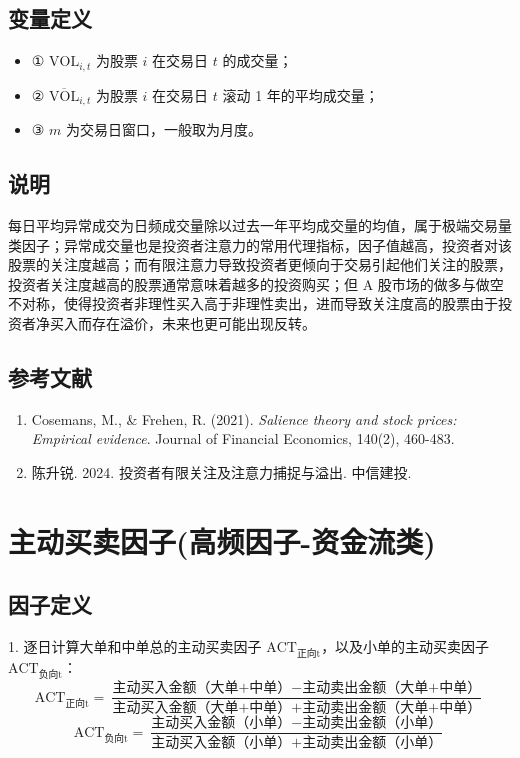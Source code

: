 \documentclass{article}
\begin{document}
\subsection{变量定义}
\begin{itemize}
    \item ① \( \mathrm{VOL}_{i,t} \) 为股票 \( i \) 在交易日 \( t \) 的成交量；
    \item ② \( \overline{\mathrm{VOL}}_{i,t} \) 为股票 \( i \) 在交易日 \( t \) 滚动 1 年的平均成交量；
    \item ③ \( m \) 为交易日窗口，一般取为月度。
\end{itemize}

\subsection{说明}
每日平均异常成交为日频成交量除以过去一年平均成交量的均值，属于极端交易量类因子；异常成交量也是投资者注意力的常用代理指标，因子值越高，投资者对该股票的关注度越高；而有限注意力导致投资者更倾向于交易引起他们关注的股票，投资者关注度越高的股票通常意味着越多的投资购买；但 A 股市场的做多与做空不对称，使得投资者非理性买入高于非理性卖出，进而导致关注度高的股票由于投资者净买入而存在溢价，未来也更可能出现反转。

\subsection{参考文献}
\begin{enumerate}
    \item Cosemans, M., \& Frehen, R. (2021). \textit{Salience theory and stock prices: Empirical evidence}. Journal of Financial Economics, 140(2), 460-483.
    \item 陈升锐. 2024. 投资者有限关注及注意力捕捉与溢出. 中信建投.
\end{enumerate}

\section{主动买卖因子(高频因子-资金流类)}

\subsection{因子定义}

1. 逐日计算大单和中单总的主动买卖因子 \( \mathrm{ACT}_{\text{正向t}} \)，以及小单的主动买卖因子 \( \mathrm{ACT}_{\text{负向t}} \)：
\begin{equation}
    \mathrm{ACT}_{\text{正向t}} = \frac{\text{主动买入金额（大单+中单）} - \text{主动卖出金额（大单+中单）}}{\text{主动买入金额（大单+中单）} + \text{主动卖出金额（大单+中单）}}
\end{equation}
\begin{equation}
    \mathrm{ACT}_{\text{负向t}} = \frac{\text{主动买入金额（小单）} - \text{主动卖出金额（小单）}}{\text{主动买入金额（小单）} + \text{主动卖出金额（小单）}}
\end{equation}
\end{document}

